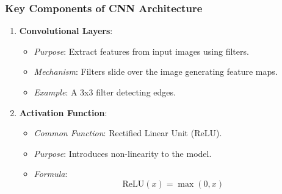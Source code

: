 \documentclass[aspectratio=169]{beamer}
\begin{document}
\begin{frame}[fragile]
    \frametitle{Key Components of CNN Architecture}
    \begin{enumerate}
        \item \textbf{Convolutional Layers}:
        \begin{itemize}
            \item \textit{Purpose}: Extract features from input images using filters.
            \item \textit{Mechanism}: Filters slide over the image generating feature maps.
            \item \textit{Example}: A 3x3 filter detecting edges.
        \end{itemize}

        \item \textbf{Activation Function}:
        \begin{itemize}
            \item \textit{Common Function}: Rectified Linear Unit (ReLU).
            \item \textit{Purpose}: Introduces non-linearity to the model.
            \item \textit{Formula}:
            \begin{equation}
            \text{ReLU}(x) = \max(0, x)
            \end{equation}
        \end{itemize}
    \end{enumerate}
\end{frame}
\end{document}
